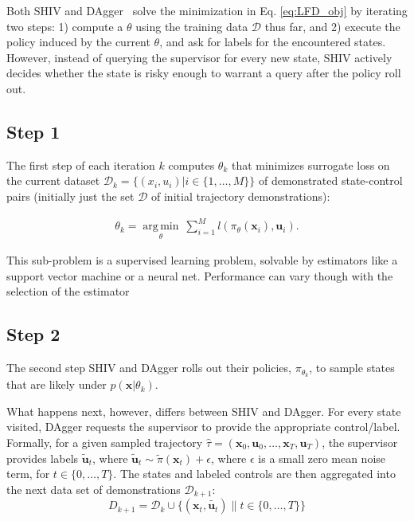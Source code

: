 \documentclass[10pt, conference]{ieeeconf}      %
\DeclareMathOperator*{\argmin}{arg\,min}
\newcommand{\bu}{\mathbf{u}}
\newcommand{\bx}{\mathbf{x}}
\newcommand{\fpnote}[1]{\ifthenelse{ \boolean{include-notes}}%
 {\textcolor{blue}{\textbf{FP: #1}}}{}}
\begin{document}
Both SHIV and DAgger~\cite{ross2010reduction} solve the minimization in Eq. \ref{eq:LFD_obj} by iterating two steps: 1) compute a $\theta$ using the training data $\mathcal{D}$ thus far, and 2) execute the policy induced by the current $\theta$, and ask for labels for the encountered states. However, instead of querying the supervisor for every new state, SHIV actively decides whether the state is risky enough to warrant a query after the policy roll out. 

 \vspace{-2ex}
 
\subsection{Step 1}
The first step of each iteration $k$  computes $\theta_k$ that minimizes surrogate loss on the current dataset $\mathcal{D}_k=\{(x_i,u_i)|i\in\{1,\ldots,M\}\}$ of demonstrated state-control pairs (initially just the set $\mathcal{D}$ of initial trajectory demonstrations):

 \vspace{-1ex}
\begin{align}\label{eq:super_objj}
\theta_{k} = \underset{\theta}{\argmin} \: \sum_{i=1}^{M} l(\pi_{\theta}(\bx_i),\bu_i).
\end{align}

This sub-problem is a supervised learning problem, solvable by estimators like a support vector machine or a neural net. Performance can vary though with the selection of the estimator~\cite{scholkopf2002learning} 
 

 \subsection{Step 2}
The second step SHIV and DAgger rolls out their policies, $\pi_{\theta_{k}}$, to sample states that are likely under $p(\bx|\theta_{k})$. 

What happens next, however, differs between SHIV and DAgger. For every state visited, DAgger requests the supervisor to provide the appropriate control/label. Formally, for a given sampled trajectory  $\hat{\tau} = (\bx_0,\bu_0,...,\bx_T,\bu_T )$, the supervisor provides labels $\tilde{\bu}_t$, where $\tilde{\bu}_t \sim \tilde{\pi}(\bx_t) + \epsilon$, where $\epsilon$ is a small zero mean noise term, for $t\in \{0, \ldots, T\}$.
The states and labeled controls are then aggregated into the next data set of demonstrations $\mathcal{D}_{k+1}$:
$$D_{k+1}=\mathcal{D}_k \cup \{(\bx_t,\tilde{\bu_t})\|t\in\{0,\ldots,T\}\} $$
\end{document}
